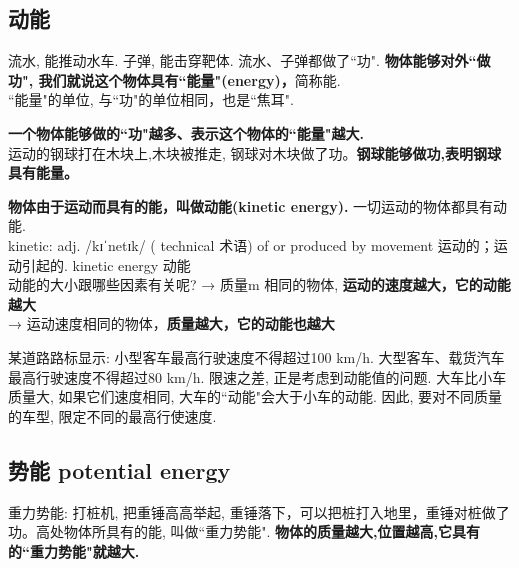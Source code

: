 \documentclass[UTF8]{ctexart}
\begin{document}
	\vspace{1em} 
	

	
	\subsection{动能}
	
	流水, 能推动水车. 子弹, 能击穿靶体. 流水、子弹都做了``功".  \textbf{物体能够对外``做功", 我们就说这个物体具有``能量"(energy)，}简称能. \\
	``能量"的单位, 与``功"的单位相同，也是``焦耳".
	
	\textbf{一个物体能够做的``功"越多、表示这个物体的``能量"越大.} \\
	
	运动的钢球打在木块上,木块被推走, 钢球对木块做了功。\textbf{钢球能够做功,表明钢球具有能量。}
	
	\textbf{物体由于运动而具有的能，叫做动能(kinetic energy).} 一切运动的物体都具有动能. \\
	
	kinetic: adj.  /kɪˈnetɪk/  ( technical 术语) of or produced by movement 运动的；运动引起的. kinetic energy 动能 \\
	
	
	动能的大小跟哪些因素有关呢?
	→ 质量m 相同的物体, \textbf{运动的速度越大，它的动能越大} \\
	→ 运动速度相同的物体，\textbf{质量越大，它的动能也越大} \\
	
	
\begin{tcolorbox}[title = {例},boxrule={0.1em},colframe={black!10}, colback={black!3},colbacktitle={black!10},coltitle={black}]
某道路路标显示: 小型客车最高行驶速度不得超过100 km/h. 大型客车、载货汽车最高行驶速度不得超过80 km/h. 限速之差, 正是考虑到动能值的问题.  大车比小车质量大, 如果它们速度相同, 大车的``动能"会大于小车的动能. 因此, 要对不同质量的车型, 限定不同的最高行使速度.
\end{tcolorbox}
	
	\vspace{1em} 
	
	
	\subsection{势能 potential energy}
	
	重力势能: 打桩机, 把重锤高高举起, 重锤落下，可以把桩打入地里，重锤对桩做了功。高处物体所具有的能, 叫做``重力势能". \textbf{物体的质量越大,位置越高,它具有的``重力势能"就越大.	} \\
	
\end{document}
